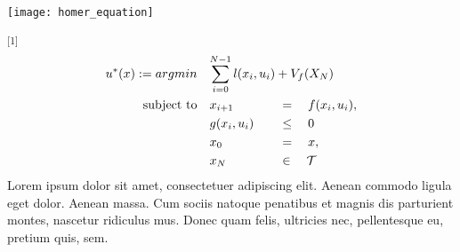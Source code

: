 \vspace{0.3cm}
\begin{center}
  \vspace{-0.4cm}
  \texttt{[image: homer\_equation]}
\end{center}
\vspace{0.25em}
\textsuperscript{[1]}\lipsum[1]
\begin{alignat*}{2}
  u^*(x) := argmin\quad &\mathrlap{\sum_{i=0}^{N-1} l(x_i, u_i) + V_f(X_{N})}&&\\
  \text{subject to}\quad &x_{i+1} &&=\quad f(x_i, u_i),\\
  &g(x_i, u_i)\quad && \le\quad 0\\
  &x_0 &&=\quad x,\\
  &x_N &&\in\quad \mathcal{T}
\end{alignat*}
Lorem ipsum dolor sit amet, consectetuer adipiscing elit. Aenean commodo ligula eget dolor. Aenean massa. Cum sociis natoque penatibus et magnis dis parturient montes, nascetur ridiculus mus. Donec quam felis, ultricies nec, pellentesque eu, pretium quis, sem.
\vspace{2em} %
